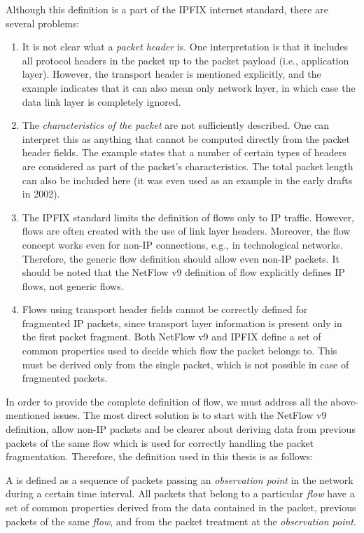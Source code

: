 Although this definition is a part of the IPFIX internet standard, there are several problems:
\begin{enumerate}
    \item It is not clear what a \emph{packet header} is. One interpretation is that it includes all protocol headers in the packet up to the packet payload (i.e., application layer). However, the transport header is mentioned explicitly, and the example indicates that it can also mean only network layer, in which case the data link layer is completely ignored.
    \item The \emph{characteristics of the packet} are not sufficiently described. One can interpret this as anything that cannot be computed directly from the packet header fields. The example states that a number of certain types of headers are considered as part of the packet's characteristics. The total packet length can also be included here (it was even used as an example in the early drafts in 2002).
    \item The IPFIX standard limits the definition of flows only to IP traffic. 
    However, flows are often created with the use of link layer headers. Moreover, the flow concept works even for non-IP connections, e.g., in technological networks. Therefore, the generic flow definition should allow even non-IP packets. It should be noted that the NetFlow v9 definition of flow explicitly defines IP flows, not generic flows.
    \item Flows using transport header fields cannot be correctly defined for fragmented IP packets, since transport layer information is present only in the first packet fragment. Both NetFlow v9 and IPFIX define a set of common properties used to decide which flow the packet belongs to. This must be derived only from the single packet, which is not possible in case of fragmented packets.
\end{enumerate}

In order to provide the complete definition of flow, we must address all the above-mentioned issues. The most direct solution is to start with the NetFlow v9 definition, allow non-IP packets and be clearer about deriving data from previous packets of the same flow which is used for correctly handling the packet fragmentation. Therefore, the definition used in this thesis is as follows:

\begin{definition}\label{def:flow}

    A \emph{} is defined as a sequence of packets passing an \emph{observation point}
    in the network during a certain time interval. All packets that belong
    to a particular \emph{flow} have a set of common properties derived from
    the data contained in the packet, previous packets of the same \emph{flow},
    and from the packet treatment at the \emph{observation point}.

\end{definition}

